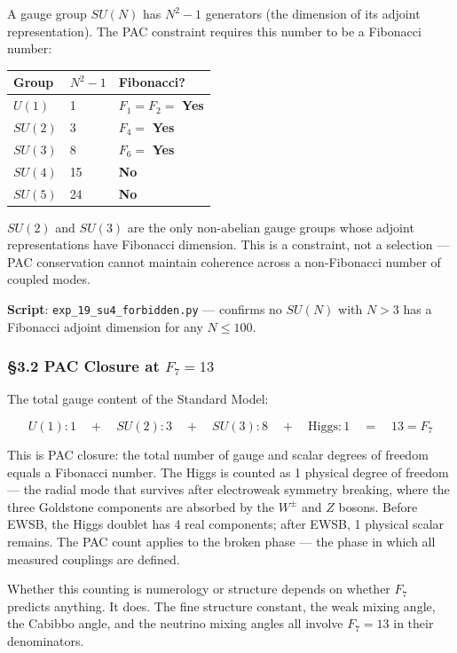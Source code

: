 \documentclass[
  11pt,
  a4paper]{article}
\begin{document}
A gauge group \(SU(N)\) has \(N^2 - 1\) generators (the dimension of its
adjoint representation). The PAC constraint requires this number to be a
Fibonacci number:

\begin{longtable}[]{@{}lll@{}}
\toprule\noalign{}
Group & \(N^2 - 1\) & Fibonacci? \\
\midrule\noalign{}
\endhead
\bottomrule\noalign{}
\endlastfoot
\(U(1)\) & 1 & \(F_1 = F_2 =\) \textbf{Yes} \\
\(SU(2)\) & 3 & \(F_4 =\) \textbf{Yes} \\
\(SU(3)\) & 8 & \(F_6 =\) \textbf{Yes} \\
\(SU(4)\) & 15 & \textbf{No} \\
\(SU(5)\) & 24 & \textbf{No} \\
\end{longtable}

\(SU(2)\) and \(SU(3)\) are the only non-abelian gauge groups whose
adjoint representations have Fibonacci dimension. This is a constraint,
not a selection --- PAC conservation cannot maintain coherence across a
non-Fibonacci number of coupled modes.

\textbf{Script}: \texttt{exp\_19\_su4\_forbidden.py} --- confirms no
\(SU(N)\) with \(N > 3\) has a Fibonacci adjoint dimension for any
\(N \leq 100\).

\subsubsection{\texorpdfstring{§3.2 PAC Closure at
\(F_7 = 13\)}{§3.2 PAC Closure at F\_7 = 13}}\label{pac-closure-at-f_7-13}

The total gauge content of the Standard Model:

\[U(1): 1 \quad + \quad SU(2): 3 \quad + \quad SU(3): 8 \quad + \quad \text{Higgs}: 1 \quad = \quad 13 = F_7\]

This is PAC closure: the total number of gauge and scalar degrees of
freedom equals a Fibonacci number. The Higgs is counted as 1 physical
degree of freedom --- the radial mode that survives after electroweak
symmetry breaking, where the three Goldstone components are absorbed by
the \(W^\pm\) and \(Z\) bosons. Before EWSB, the Higgs doublet has 4
real components; after EWSB, 1 physical scalar remains. The PAC count
applies to the broken phase --- the phase in which all measured
couplings are defined.

Whether this counting is numerology or structure depends on whether
\(F_7\) predicts anything. It does. The fine structure constant, the
weak mixing angle, the Cabibbo angle, and the neutrino mixing angles all
involve \(F_7 = 13\) in their denominators.
\end{document}
